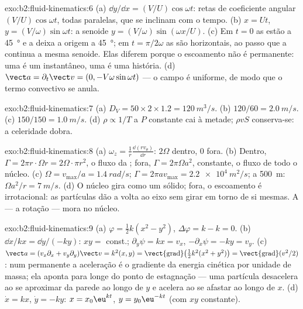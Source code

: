 \begin{solution}{exo:b2:fluid-kinematics:6}
(a) $\dd y/\dd x = (V/U)\cos\omega t$: retas de coeficiente angular
$(V/U)\cos\omega t$, todas paralelas, que se inclinam com o tempo. (b) $x = Ut$, $y =
(V/\omega)\sin\omega t$: a senoide $y = (V/\omega)\sin(\omega x/U)$. (c) Em
$t = 0$ as  estão a \qty{45}{\degree} e a  deixa
a origem a \qty{45}{\degree}; em $t = \pi/2\omega$ as  são
horizontais, ao passo que a  continua a mesma senoide. Elas diferem porque
o escoamento não é permanente: uma  é um instantâneo, uma  é uma história.
(d) $\vect a = \partial_t\vect v = (0, -V\omega\sin\omega t)$ --- o campo é
uniforme, de modo que o termo convectivo se anula.
\end{solution}

\begin{solution}{exo:b2:fluid-kinematics:7}
(a) $D_V = 50 \times 2 \times 1.2 = \qty{120}{m^3/s}$. (b) $120/60 = \qty{2.0}{m/s}$.
(c) $150/150 = \qty{1.0}{m/s}$. (d) $\rho \propto 1/T$ a $P$ constante cai à metade;
$\rho vS$ conserva-se: a celeridade dobra.
\end{solution}

\begin{solution}{exo:b2:fluid-kinematics:8}
(a) $\omega_z = \frac1r\frac{\dd(rv_\theta)}{\dd r}$: $2\Omega$ dentro, $0$
fora. (b) Dentro, $\Gamma = 2\pi r\cdot\Omega r = 2\Omega\cdot\pi r^2$, o fluxo
da ; fora, $\Gamma = 2\pi\Omega a^2$, constante, o fluxo de
todo o núcleo. (c) $\Omega = v_{\max}/a = \qty{1.4}{rad/s}$; $\Gamma = 2\pi av_{\max}
= \qty{2.2e4}{m^2/s}$; a \qty{500}{m}: $\Omega a^2/r = \qty{7}{m/s}$. (d) O
núcleo gira como um sólido; fora, o escoamento é irrotacional: as partículas
dão a volta ao eixo sem girar em torno de si mesmas. A  ---
a rotação --- mora no núcleo.
\end{solution}

\begin{solution}{exo:b2:fluid-kinematics:9}
(a) $\varphi = \tfrac12k(x^2 - y^2)$, $\Delta\varphi = k - k = 0$. (b) $\dd x/
kx = \dd y/(-ky)$: $xy = $ const.; $\partial_y\psi = kx = v_x$, $-\partial_x\psi =
-ky = v_y$. (c) $\vect a = (v_x\partial_x + v_y\partial_y)\vect v = k^2(x, y) =
\operatorname{\vect{grad}}\bigl(\tfrac12k^2(x^2 + y^2)\bigr) = \operatorname{\vect{grad}}
(v^2/2)$: num  permanente a aceleração é o
gradiente da energia cinética por unidade de massa; ela aponta para longe do
ponto de estagnação --- uma partícula desacelera ao se aproximar da parede
ao longo de $y$ e acelera ao se afastar ao longo de $x$. (d) $\dot x = kx$, $\dot y = -ky$:
$x = x_0\eu^{kt}$, $y = y_0\eu^{-kt}$ (com $xy$ constante).
\end{solution}

